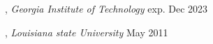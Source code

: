
, \textit{Georgia Institute of Technology}	\hfill exp. Dec 2023

, \textit{Louisiana state University} \hfill	May 2011

